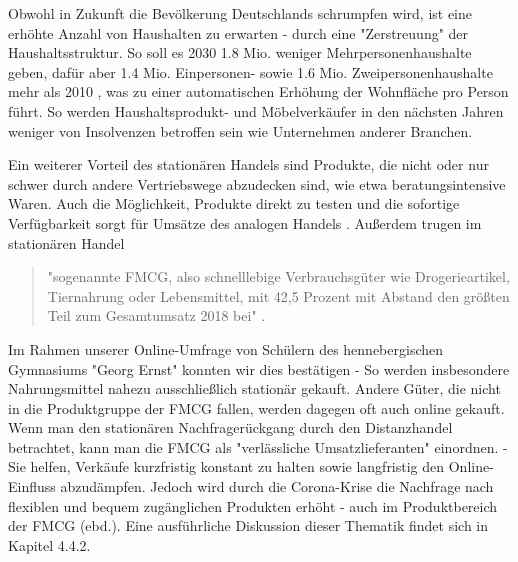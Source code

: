\begin{folding}
Obwohl in Zukunft die Bevölkerung Deutschlands schrumpfen wird, ist eine erhöhte Anzahl von Haushalten zu erwarten - durch eine "Zerstreuung" der Haushaltsstruktur. So soll es 2030 1.8 Mio. weniger Mehrpersonenhaushalte geben, dafür aber 1.4 Mio. Einpersonen- sowie 1.6 Mio. Zweipersonenhaushalte mehr als 2010 \cite[S. 35]{Nitt}, was zu einer automatischen Erhöhung der Wohnfläche pro Person führt. So werden Haushaltsprodukt- und Möbelverkäufer in den nächsten Jahren weniger von Insolvenzen betroffen sein wie Unternehmen anderer Branchen.

Ein weiterer Vorteil des stationären Handels sind Produkte, die nicht oder nur schwer durch andere Vertriebswege abzudecken sind, wie etwa beratungsintensive Waren. Auch die Möglichkeit, Produkte direkt zu testen und die sofortige Verfügbarkeit sorgt für Umsätze des analogen Handels \cite[S. 2]{Maier}. Außerdem trugen im stationären Handel
\begin{quote}
 "sogenannte \ac{FMCG}, also schnelllebige Verbrauchsgüter wie   Drogerieartikel,   Tiernahrung   oder   Lebensmittel,   mit 42,5 Prozent mit Abstand den größten Teil zum Gesamtumsatz 2018 bei" \cite{corona-schub}.
\end{quote}

\noindent Im Rahmen unserer Online-Umfrage von Schülern des hennebergischen Gymnasiums "Georg Ernst" konnten wir dies  bestätigen - So werden insbesondere Nahrungsmittel nahezu ausschließlich stationär gekauft. Andere Güter, die nicht in die Produktgruppe der \ac{FMCG} fallen, werden dagegen oft auch online gekauft. Wenn man den stationären Nachfragerückgang durch den Distanzhandel betrachtet, kann man die \ac{FMCG} als "verlässliche Umsatzlieferanten" einordnen. - Sie helfen, Verkäufe kurzfristig konstant zu halten sowie langfristig den Online-Einfluss abzudämpfen. Jedoch wird durch die Corona-Krise die Nachfrage nach flexiblen und bequem zugänglichen Produkten erhöht - auch im Produktbereich der \ac{FMCG} (ebd.). Eine ausführliche Diskussion dieser Thematik findet sich in Kapitel 4.4.2.


\end{folding}

